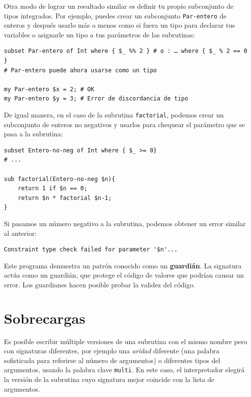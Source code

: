 Otra modo de lograr un resultado similar es definir tu propio
subconjunto de tipos integrados. Por ejemplo, puedes crear un
subconjunto {\tt Par-entero} de enteros y después usarlo más o 
menos como si fuera un tipo para declarar tus variables o asignarle
un tipo a tus parámetros de las subrutinas:

\begin{lstlisting}
subset Par-entero of Int where { $_ %% 2 } # o : … where { $_ % 2 == 0 }
# Par-entero puede ahora usarse como un tipo

my Par-entero $x = 2; # OK
my Par-entero $y = 3; # Error de discordancia de tipo
\end{lstlisting}

De igual manera, en el caso de la subrutina {\tt factorial},
podemos crear un subconjunto de enteros no negativos y usarlos
para chequear el parámetro que se pasa a la subrutina:

\begin{lstlisting}
subset Entero-no-neg of Int where { $_ >= 0}
# ...

sub factorial(Entero-no-neg $n){
    return 1 if $n == 0;
    return $n * factorial $n-1;
}
\end{lstlisting}
%
Si pasamos un número negativo a la subrutina, 
podemos obtener un error similar al anterior:

\begin{lstlisting}
Constraint type check failed for parameter '$n'...
\end{lstlisting}

Este programa demuestra un patrón conocido como un {\bf guardián}.
La signatura actúa como un guardián, que protege el código de valores
que podrían causar un error. Los guardianes hacen posible probar la validez
del código.

\section{Sobrecargas}
\label{multisubs}

Es posible escribir múltiple versiones de una subrutina 
con el mismo nombre pero con signaturas diferentes, por ejemplo
una \emph{aridad} diferente (una palabra sofisticada para referirse
al número de argumentos) o diferentes tipos del argumentos, usando 
la palabra clave {\tt multi}. En este caso, el interpretador 
elegirá la versión de la subrutina cuyo signatura mejor coincide con
la lista de argumentos.

